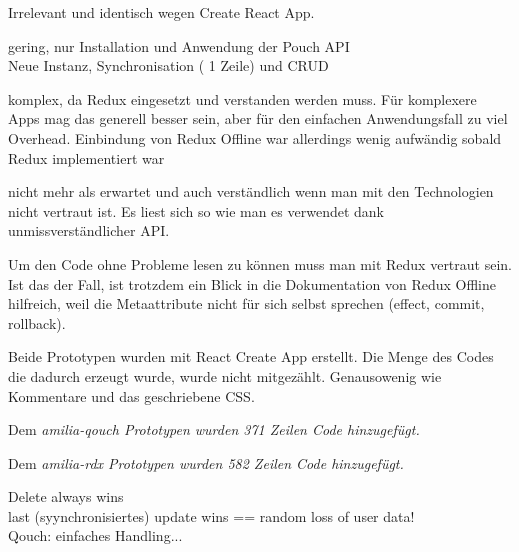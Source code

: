 
Irrelevant und identisch wegen Create React App.

%
\begin{description}[leftmargin=0.5cm,style=nextline]
  \item[amilia-qouch]
  gering, nur Installation und Anwendung der Pouch API\\
  Neue Instanz, Synchronisation ( 1 Zeile) und CRUD
  \item[amilia-rdx]
  komplex, da Redux eingesetzt und verstanden werden muss. Für komplexere Apps mag das generell besser sein, aber für den einfachen Anwendungsfall zu viel Overhead. Einbindung von Redux Offline war allerdings wenig aufwändig sobald Redux implementiert war
\end{description}
%
\begin{description}[leftmargin=0.5cm,style=nextline]
  \item[amilia-qouch]
  nicht mehr als erwartet und auch verständlich wenn man mit den Technologien nicht vertraut ist. Es liest sich so wie man es verwendet dank unmissverständlicher API.
  \item[amilia-rdx] 
  Um den Code ohne Probleme lesen zu können muss man mit Redux vertraut sein. Ist das der Fall, ist trotzdem ein Blick in die Dokumentation von Redux Offline hilfreich, weil die Metaattribute nicht für sich selbst sprechen (effect, commit, rollback).
\end{description}
%
  Beide Prototypen wurden mit React Create App erstellt. Die Menge des Codes die dadurch erzeugt wurde, wurde nicht mitgezählt. Genausowenig wie Kommentare und das geschriebene \gls{CSS}.
  \begin{description}[leftmargin=0.5cm,style=nextline]
    \item[amilia-qouch]
    Dem \it{amilia-qouch} Prototypen wurden 371 Zeilen Code hinzugefügt.
    \item[amilia-rdx] 
    Dem \it{amilia-rdx} Prototypen wurden 582 Zeilen Code hinzugefügt.
\end{description}
%
Delete always wins\\
last (syynchronisiertes) update wins == random loss of user data!\\
Qouch: einfaches Handling...

